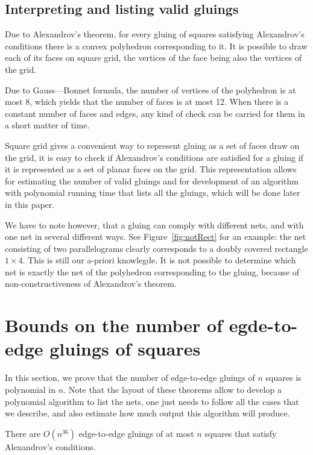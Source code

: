 \documentclass[a4paper,11pt]{article}
\begin{document}
\subsection{Interpreting and listing valid gluings}

Due to Alexandrov's theorem, for every gluing of squares satisfying Alexandrov's conditions there is a convex polyhedron corresponding to it. It is possible to draw each of its faces on square grid, the vertices of the face being also the vertices of the grid.

Due to Gauss—Bonnet formula, the number of vertices of the polyhedron is at most 8, which yields that the number of faces is at most 12. When there is a constant number of faces and edges, any kind of check can be carried for them in a short matter of time.

Square grid gives a convenient way to represent gluing as a set of faces draw on the grid, it is easy to check if Alexandrov's conditions are satisfied for a gluing if it is represented as a set of planar faces on the grid. This representation allows for estimating the number of valid gluings and for development of an algorithm with polynomial running time that lists all the gluings, which will be done later in this paper.

We have to note however, that a gluing can comply with different nets, and with one net in several different ways. See Figure~\ref{fig:notRect} for an example: the net consisting of two parallelograms clearly corresponds to a doubly covered rectangle $1 \times 4$. This is still our a-priori knowlegde. It is not possible to determine which net is exactly the net of the polyhedron corresponding to the gluing, because of non-constructiveness of Alexandrov's theorem.

% 

\section{Bounds on the number of egde-to-edge gluings of squares}

In this section, we prove that the number of edge-to-edge gluings of $n$ squares is polynomial in $n$. Note that the layout of these theorems allow to develop a polynomial algorithm to list the nets, one just needs to follow all the cases that we describe, and also estimate how much output this algorithm will produce.

\begin{theorem} \label{thm:n36}
	There are $O \left( n^{36} \right)$ edge-to-edge gluings of at most $n$ squares that satisfy Alexandrov's conditions.
\end{theorem}
\end{document}
